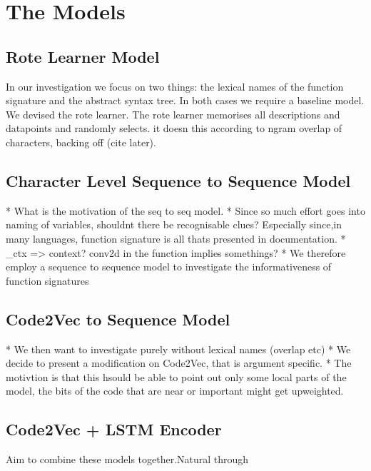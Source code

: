\chapter{The Models}
\label{the_models}

\section{Rote Learner Model} %
\label{sec:rote_learner_model}

In our investigation we focus on two things: the lexical names of the function signature and the abstract syntax tree. In both cases we require a baseline model. We devised the rote learner. The rote learner memorises all descriptions and datapoints and randomly selects. it doesn this according to ngram overlap of characters, backing off (cite later).


\section{Character Level Sequence to Sequence Model} %
\label{sec:character_level_sequence_to_sequence}

* What is the motivation of the seq to seq model.
* Since so much effort goes into naming of variables, shouldnt there be recognisable clues? Especially since,in many languages, function signature is all thats presented in documentation.
* \_ctx => context? conv2d in the function implies somethings?
* We therefore employ a sequence to sequence model to investigate the informativeness of function signatures




\section{Code2Vec to Sequence Model} %
\label{sec:code2vec_to_sequence_model}

* We then want to investigate purely without lexical names (overlap etc)
* We decide to present a modification on Code2Vec, that is argument specific.
* The motivtion is that this hsould be able to point out only some local parts of the model, the bits of the code that are near or important might get upweighted.



\section{Code2Vec + LSTM Encoder} %
\label{sub:code2vec_sequence_to_sequence}

Aim to combine these models together.Natural through 

